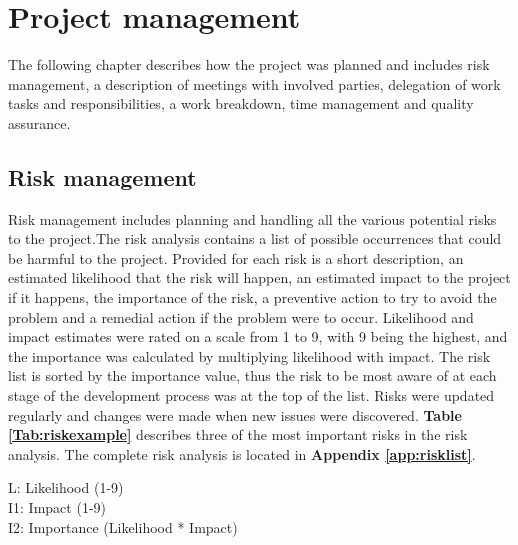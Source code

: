 
\chapter{Project management}

The following chapter describes how the project was planned and includes risk management, a description of meetings with involved parties, delegation of work tasks and responsibilities, a work breakdown, time management and quality assurance.

\section{Risk management}
\label{sec:risk_management}

Risk management includes planning and handling all the various potential risks to the project.The risk analysis contains a list of possible occurrences that could be harmful to the project. Provided for each risk is a short description, an estimated likelihood that the risk will happen, an estimated impact to the project if it happens, the importance of the risk, a preventive action to try to avoid the problem and a remedial action if the problem were to occur. Likelihood and impact estimates were rated on a scale from 1 to 9, with 9 being the highest, and the importance was calculated by multiplying likelihood with impact. The risk list is sorted by the importance value, thus the risk to be most aware of at each stage of the development process was at the top of the list. Risks were updated regularly and changes were made when new issues were discovered.
\textbf{Table \ref{Tab:riskexample}} describes three of the most important risks in the risk analysis. The complete risk analysis is located in \textbf{Appendix \ref{app:risklist}}.\newline

L: Likelihood (1-9)\\
I1: Impact (1-9)\\
I2: Importance (Likelihood * Impact)\\

